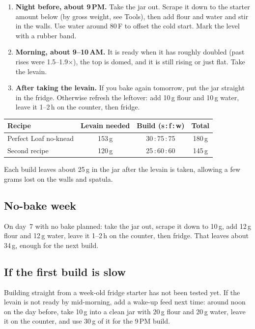 \documentclass[11pt]{article}
\newcommand{\feed}[3]{#1\,:\,#2\,:\,#3}   %
\newcommand{\plNeed}{153}
\newcommand{\plS}{30}\newcommand{\plF}{75}\newcommand{\plW}{75}
\newcommand{\plTotal}{180}
\newcommand{\rbNeed}{120}
\newcommand{\rbS}{25}\newcommand{\rbF}{60}\newcommand{\rbW}{60}
\newcommand{\rbTotal}{145}
\newcommand{\refF}{10}\newcommand{\refW}{10}
\newcommand{\mainS}{10}\newcommand{\mainF}{12}\newcommand{\mainW}{12}
\newcommand{\buildTime}{9\,PM}
\newcommand{\readyTime}{9--10\,AM}
\begin{document}
\begin{enumerate}
  \item \textbf{Night before, about \buildTime.} Take the jar out. Scrape it down to
        the starter amount below (by gross weight, see Tools), then add flour and
        water and stir in the walls. Use water around 80\,\textdegree F to offset the
        cold start. Mark the level with a rubber band.
  \item \textbf{Morning, about \readyTime.} It is ready when it has roughly
        doubled (past rises were 1.5--1.9$\times$), the top is domed, and it is still
        rising or just flat. Take the levain.
  \item \textbf{After taking the levain.} If you bake again tomorrow, put the jar
        straight in the fridge. Otherwise refresh the leftover: add \refF\,g flour and
        \refW\,g water, leave it 1--2\,h on the counter, then fridge.
\end{enumerate}

\begin{center}
\begin{tabular}{@{}lccc@{}}
\toprule
Recipe & Levain needed & Build (s\,:\,f\,:\,w) & Total \\
\midrule
Perfect Loaf no-knead & \plNeed\,g & \feed{\plS}{\plF}{\plW} & \plTotal\,g \\
Second recipe          & \rbNeed\,g & \feed{\rbS}{\rbF}{\rbW} & \rbTotal\,g \\
\bottomrule
\end{tabular}
\end{center}

Each build leaves about 25\,g in the jar after the levain is taken, allowing a few
grams lost on the walls and spatula.

\subsection*{No-bake week}

On day~7 with no bake planned: take the jar out, scrape it down to \mainS\,g, add
\mainF\,g flour and \mainW\,g water, leave it 1--2\,h on the counter, then fridge.
That leaves about 34\,g, enough for the next build.

\subsection*{If the first build is slow}

Building straight from a week-old fridge starter has not been tested yet. If the
levain is not ready by mid-morning, add a wake-up feed next time: around noon on the
day before, take 10\,g into a clean jar with 20\,g flour and 20\,g water, leave it on
the counter, and use 30\,g of it for the \buildTime{} build.
\end{document}
